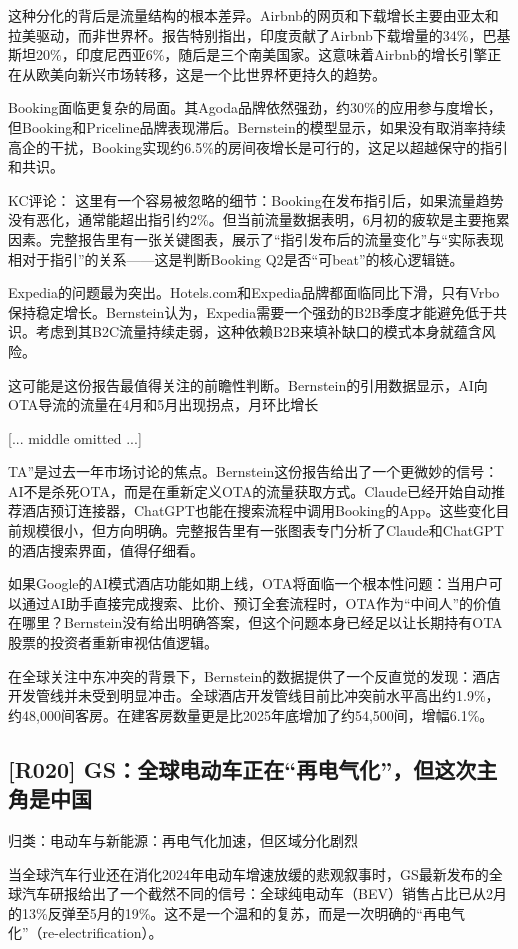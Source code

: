 \documentclass[11pt]{ctexart}
\begin{document}
这种分化的背后是流量结构的根本差异。Airbnb的网页和下载增长主要由亚太和拉美驱动，而非世界杯。报告特别指出，印度贡献了Airbnb下载增量的34\%，巴基斯坦20\%，印度尼西亚6\%，随后是三个南美国家。这意味着Airbnb的增长引擎正在从欧美向新兴市场转移，这是一个比世界杯更持久的趋势。

Booking面临更复杂的局面。其Agoda品牌依然强劲，约30\%的应用参与度增长，但Booking和Priceline品牌表现滞后。Bernstein的模型显示，如果没有取消率持续高企的干扰，Booking实现约6.5\%的房间夜增长是可行的，这足以超越保守的指引和共识。

KC评论： 这里有一个容易被忽略的细节：Booking在发布指引后，如果流量趋势没有恶化，通常能超出指引约2\%。但当前流量数据表明，6月初的疲软是主要拖累因素。完整报告里有一张关键图表，展示了“指引发布后的流量变化”与“实际表现相对于指引”的关系——这是判断Booking Q2是否“可beat”的核心逻辑链。

Expedia的问题最为突出。Hotels.com和Expedia品牌都面临同比下滑，只有Vrbo保持稳定增长。Bernstein认为，Expedia需要一个强劲的B2B季度才能避免低于共识。考虑到其B2C流量持续走弱，这种依赖B2B来填补缺口的模式本身就蕴含风险。

这可能是这份报告最值得关注的前瞻性判断。Bernstein的引用数据显示，AI向OTA导流的流量在4月和5月出现拐点，月环比增长

[... middle omitted ...]

TA”是过去一年市场讨论的焦点。Bernstein这份报告给出了一个更微妙的信号：AI不是杀死OTA，而是在重新定义OTA的流量获取方式。Claude已经开始自动推荐酒店预订连接器，ChatGPT也能在搜索流程中调用Booking的App。这些变化目前规模很小，但方向明确。完整报告里有一张图表专门分析了Claude和ChatGPT的酒店搜索界面，值得仔细看。

如果Google的AI模式酒店功能如期上线，OTA将面临一个根本性问题：当用户可以通过AI助手直接完成搜索、比价、预订全套流程时，OTA作为“中间人”的价值在哪里？Bernstein没有给出明确答案，但这个问题本身已经足以让长期持有OTA股票的投资者重新审视估值逻辑。

在全球关注中东冲突的背景下，Bernstein的数据提供了一个反直觉的发现：酒店开发管线并未受到明显冲击。全球酒店开发管线目前比冲突前水平高出约1.9\%，约48,000间客房。在建客房数量更是比2025年底增加了约54,500间，增幅6.1\%。

\subsection{[R020] GS：全球电动车正在“再电气化”，但这次主角是中国}
{\small\color{refgray}归类：电动车与新能源：再电气化加速，但区域分化剧烈}

当全球汽车行业还在消化2024年电动车增速放缓的悲观叙事时，GS最新发布的全球汽车研报给出了一个截然不同的信号：全球纯电动车（BEV）销售占比已从2月的13\%反弹至5月的19\%。这不是一个温和的复苏，而是一次明确的“再电气化”（re-electrification）。
\end{document}
